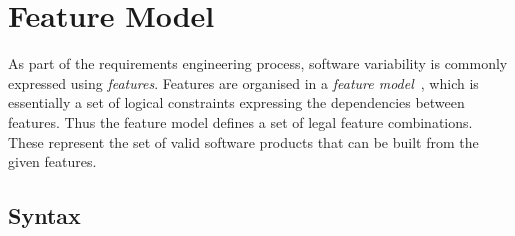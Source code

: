 % 
% 



\section{Feature Model}
\label{sec:feature model}

As part of the requirements engineering process, software variability is
commonly expressed using \emph{features}. Features are organised in a
\emph{feature model}~\cite{Batory:2006,KangCHNP90}, which is
essentially a set of logical constraints expressing the dependencies between
features. Thus the feature model defines a set of legal feature combinations.
These represent the set of valid software products that can be built from the
given features.

\subsection{Syntax}
\label{sec:mutvl-syntax}


